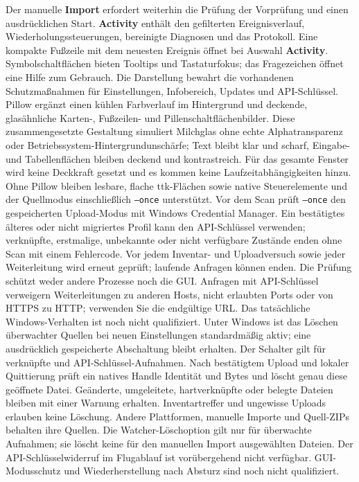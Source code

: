 \documentclass[11pt,a4paper]{article}
\newcommand{\ui}[1]{\textbf{#1}}
\begin{document}
Der manuelle \ui{Import} erfordert weiterhin die Prüfung der Vorprüfung und
einen
ausdrücklichen Start. \ui{Activity} enthält den gefilterten Ereignisverlauf,
Wiederholungssteuerungen, bereinigte Diagnosen und das Protokoll. Eine kompakte
Fußzeile mit dem neuesten Ereignis öffnet bei Auswahl \ui{Activity}.
Symbolschaltflächen bieten Tooltips und Tastaturfokus; das Fragezeichen öffnet
eine Hilfe zum
Gebrauch. Die Darstellung bewahrt die vorhandenen Schutzmaßnahmen für
Einstellungen, Infobereich, Updates und API-Schlüssel. Pillow ergänzt einen
kühlen Farbverlauf im Hintergrund und deckende,
glasähnliche Karten-, Fußzeilen- und Pillenschaltflächenbilder. Diese
zusammengesetzte Gestaltung simuliert Milchglas ohne echte Alphatransparenz oder
Betriebssystem-Hintergrundunschärfe; Text bleibt klar und scharf, Eingabe- und
Tabellenflächen bleiben deckend und kontrastreich. Für das gesamte Fenster wird
keine Deckkraft
gesetzt und es kommen keine Laufzeitabhängigkeiten hinzu. Ohne Pillow bleiben
lesbare,
flache ttk-Flächen sowie native Steuerelemente und der Quellmodus einschließlich
\texttt{--once} unterstützt.
Vor dem Scan prüft \texttt{--once} den gespeicherten Upload-Modus mit Windows
Credential Manager. Ein bestätigtes älteres oder nicht migriertes Profil kann
den API-Schlüssel verwenden; verknüpfte, erstmalige, unbekannte oder nicht
verfügbare Zustände enden ohne Scan mit einem Fehlercode. Vor jedem Inventar-
und Uploadversuch sowie jeder Weiterleitung wird erneut geprüft; laufende
Anfragen können enden. Die Prüfung schützt weder andere Prozesse noch die GUI.
Anfragen mit API-Schlüssel verweigern Weiterleitungen zu anderen Hosts,
nicht erlaubten Ports oder von HTTPS zu HTTP; verwenden Sie die endgültige URL.
Das tatsächliche Windows-Verhalten ist noch nicht qualifiziert.
Unter Windows ist das Löschen überwachter Quellen bei neuen Einstellungen
standardmäßig aktiv; eine ausdrücklich gespeicherte Abschaltung bleibt erhalten.
Der Schalter gilt für verknüpfte und API-Schlüssel-Aufnahmen. Nach bestätigtem
Upload und lokaler Quittierung prüft ein natives Handle Identität und Bytes
und löscht genau diese geöffnete Datei. Geänderte, umgeleitete, hartverknüpfte
oder belegte Dateien bleiben mit einer Warnung erhalten. Inventartreffer und
ungewisse Uploads erlauben keine Löschung. Andere Plattformen, manuelle Importe
und Quell-ZIPs behalten ihre Quellen. Die Watcher-Löschoption gilt nur für
überwachte Aufnahmen; sie löscht keine für den manuellen Import ausgewählten
Dateien.
Der API-Schlüsselwiderruf im Flugablauf ist vorübergehend nicht verfügbar.
GUI-Modusschutz und Wiederherstellung nach Absturz sind noch nicht qualifiziert.
\end{document}

